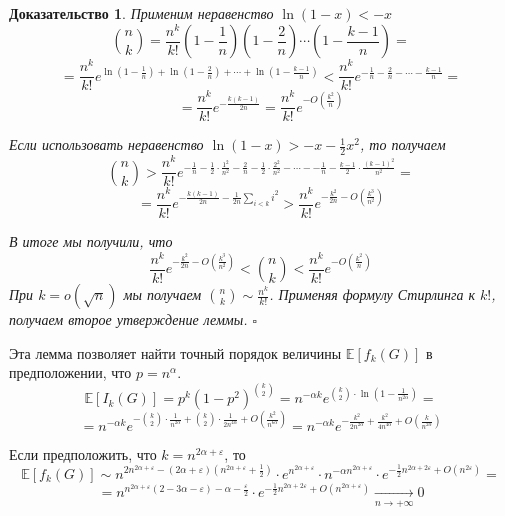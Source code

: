 \documentclass[a4paper]{article}
\newtheorem*{msolution}{Доказательство}
\begin{document}
\begin{msolution}
    Применим неравенство $\ln(1-x) < -x$ $$\binom{n}{k} = \frac{n^k}{k!}\left(1-\frac{1}{n}\right)
    \left(1-\frac{2}{n}\right)\cdots\left(1-\frac{k-1}{n}\right) = $$ $$ = \frac{n^k}{k!}e^{\ln\left(1-\frac{1}{n}\right) + 
    \ln\left(1-\frac{2}{n}\right) + \cdots + \ln\left(1-\frac{k-1}{n}\right)} < \frac{n^k}{k!}e^{-\frac{1}{n} -
    \frac{2}{n}-\cdots -\frac{k-1}{n}} = $$ $$ = \frac{n^k}{k!}e^{-\frac{k(k-1)}{2n}} = \frac{n^k}{k!}e^{-O\left(\frac{k^2}{n}\right)}$$
    
    Если использовать неравенство $\ln(1-x) > -x - \frac{1}{2}x^2$, то получаем $$\binom{n}{k} > 
    \frac{n^k}{k!}e^{-\frac{1}{n} - \frac{1}{2}\cdot\frac{1^2}{n^2} - \frac{2}{n} - \frac{1}{2}\cdot\frac{2^2}{n^2} - 
    \cdots - -\frac{1}{n} - \frac{k-1}{2}\cdot\frac{(k-1)^2}{n^2}} = $$ $$ = \frac{n^k}{k!}e^{-\frac{k(k-1)}{2n}-
    \frac{1}{2n}\sum\limits_{i<k}i^2}  > \frac{n^k}{k!}e^{-\frac{k^2}{2n}-O\left(\frac{k^3}{n^2}\right)}$$
    
    В итоге мы получили, что $$\frac{n^k}{k!}e^{-\frac{k^2}{2n}-O\left(\frac{k^3}{n^2}\right)} < \binom{n}{k} < 
    \frac{n^k}{k!}e^{-O\left(\frac{k^2}{n}\right)}$$ При $k = o(\sqrt{n})$ мы получаем $\binom{n}{k} \sim \frac{n^k}{k!}$.
    Применяя формулу Стирлинга к $k!$, получаем второе утверждение леммы. $\square$
\end{msolution}
    
Эта лемма позволяет найти точный порядок величины $\mathbb{E}[f_k(G)]$ в предположении, что $p = n^\alpha$.
$$\mathbb{E}[I_k(G)] = p^k(1-p^2)^{\binom{k}{2}} = n^{-\alpha k}e^{\binom{k}{2}\cdot\ln\left(1-\frac{1}{n^{2\alpha}}\right)} = $$
$$ = n^{-\alpha k}e^{-\binom{k}{2}\cdot\frac{1}{n^{2\alpha}} + \binom{k}{2}\cdot\frac{1}{2n^{4\alpha}}+ 
O\left(\frac{k^2}{n^{6\alpha}}\right)} = n^{-\alpha k}e^{-\frac{k^2}{2n^{2\alpha}} + \frac{k^2}{4n^{4\alpha}} + 
O\left(\frac{k}{n^{2\alpha}}\right)}$$

Если предположить, что $k = n^{2\alpha + \varepsilon}$, то $$\mathbb{E}[f_k(G)] \sim n^{2n^{2\alpha + \varepsilon} -
(2\alpha + \varepsilon)(n^{2\alpha + \varepsilon} + \frac{1}{2})}\cdot e^{n^{2\alpha + \varepsilon}}\cdot 
n^{-\alpha n^{2\alpha+\varepsilon}}\cdot e^{-\frac{1}{2}n^{2\alpha + 2\varepsilon} + O\left(n^{2\varepsilon}\right)} = $$
$$ = n^{n^{2\alpha + \varepsilon}(2 - 3\alpha - \varepsilon) - \alpha - \frac{\varepsilon}{2}}\cdot 
e^{-\frac{1}{2}n^{2\alpha + 2\varepsilon} + O\left(n^{2\alpha + \varepsilon}\right)}\xrightarrow[n \to +\infty]{} 0$$
\end{document}
